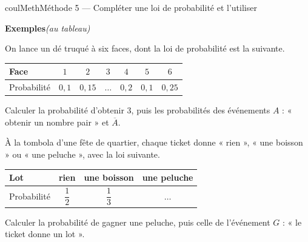\documentclass[11pt,a4paper]{article}
\makeatletter
\newcounter{lycee@signet}
\newcommand{\signet}[3][]{\stepcounter{lycee@signet}%
  \edef\lycee@dest{\if\relax\detokenize{#1}\relax
    signet.\arabic{lycee@signet}\else#1\fi}%
  \hypertarget{\lycee@dest}{}\bookmark[level=#2,dest=\lycee@dest]{#3}}
\newcounter{methode}
\newenvironment{methodebox}[1][Méthode]{\stepcounter{methode}%
  \begin{boitecours}[phantom={\signet[methode-\arabic{methode}]{2}{#1}}]{coulMeth}{#1}}%
  {\end{boitecours}}
\newcommand{\autableau}{\hfill{\footnotesize\itshape\color{black!45}(au tableau)}}
\newcommand{\etapeexemples}{%
    \par\smallskip\textbf{\color{coulMeth}Exemples}\autableau\par\nobreak\smallskip}
\makeatother
\begin{document}
\begin{methodebox}[Méthode 5 --- Compléter une loi de probabilité et l'utiliser]
\etapeexemples
\begin{questions}[label=\alph*)]
  \item On lance un dé truqué à six faces, dont la loi de probabilité est la suivante.
    \begin{center}
    \renewcommand{\arraystretch}{1.5}
    \begin{tabular}{|l|c|c|c|c|c|c|}
    \hline
    Face & $1$ & $2$ & $3$ & $4$ & $5$ & $6$ \\
    \hline
    Probabilité & $0{,}1$ & $0{,}15$ & $\dots$ & $0{,}2$ & $0{,}1$ & $0{,}25$ \\
    \hline
    \end{tabular}
    \end{center}
    Calculer la probabilité d'obtenir $3$, puis les probabilités des événements $A$ :
    « obtenir un nombre pair » et $\overline{A}$.
  \item À la tombola d'une fête de quartier, chaque ticket donne « rien », « une
    boisson » ou « une peluche », avec la loi suivante.
    \begin{center}
    \renewcommand{\arraystretch}{2.4}
    \begin{tabular}{|l|c|c|c|}
    \hline
    Lot & rien & une boisson & une peluche \\
    \hline
    Probabilité & $\dfrac{1}{2}$ & $\dfrac{1}{3}$ & $\dots$ \\
    \hline
    \end{tabular}
    \end{center}
    Calculer la probabilité de gagner une peluche, puis celle de l'événement $G$ :
    « le ticket donne un lot ».
\end{questions}


\end{methodebox}
\end{document}
